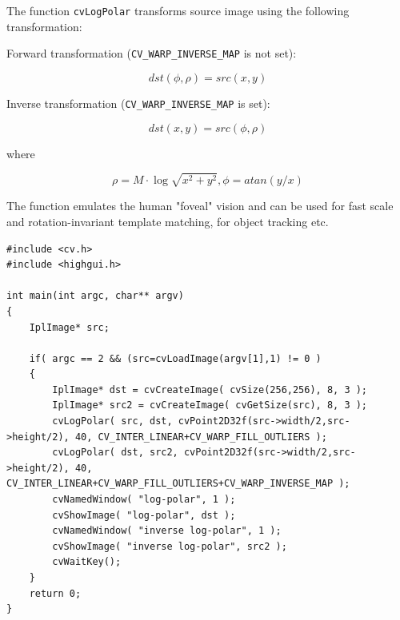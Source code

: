 \begin{description}
\end{description}

The function \texttt{cvLogPolar} transforms source image using the following transformation:

Forward transformation (\texttt{CV\_WARP\_INVERSE\_MAP} is not set):

\[
dst(\phi,\rho) = src(x,y)
\]

Inverse transformation (\texttt{CV\_WARP\_INVERSE\_MAP} is set):

\[
dst(x,y) = src(\phi,\rho)
\]

where

\[
\rho = M \cdot \log{\sqrt{x^2 + y^2}},
\phi=atan(y/x)
\]

The function emulates the human "foveal" vision and can be used for fast scale and rotation-invariant template matching, for object tracking etc.

\begin{lstlisting}
#include <cv.h>
#include <highgui.h>

int main(int argc, char** argv)
{
    IplImage* src;

    if( argc == 2 && (src=cvLoadImage(argv[1],1) != 0 )
    {
        IplImage* dst = cvCreateImage( cvSize(256,256), 8, 3 );
        IplImage* src2 = cvCreateImage( cvGetSize(src), 8, 3 );
        cvLogPolar( src, dst, cvPoint2D32f(src->width/2,src->height/2), 40, CV_INTER_LINEAR+CV_WARP_FILL_OUTLIERS );
        cvLogPolar( dst, src2, cvPoint2D32f(src->width/2,src->height/2), 40, CV_INTER_LINEAR+CV_WARP_FILL_OUTLIERS+CV_WARP_INVERSE_MAP );
        cvNamedWindow( "log-polar", 1 );
        cvShowImage( "log-polar", dst );
        cvNamedWindow( "inverse log-polar", 1 );
        cvShowImage( "inverse log-polar", src2 );
        cvWaitKey();
    }
    return 0;
}
\end{lstlisting}

